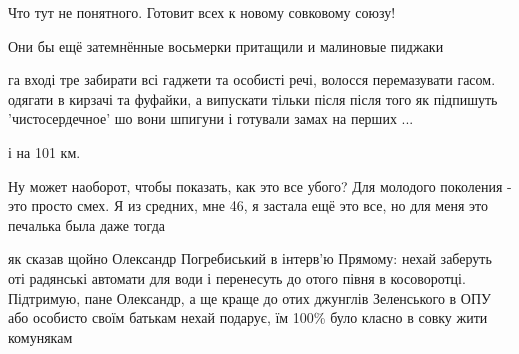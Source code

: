 \begin{itemize}
Что тут не понятного. Готовит всех к новому совковому союзу!

 
Они бы ещё затемнённые восьмерки притащили и малиновые пиджаки

 

га вході тре забирати всі гаджети та особисті речі, волосся перемазувати гасом.
одягати в кирзачі та фуфайки, а випускати тільки після після того як підпишуть
'чистосердечное' шо вони шпигуни і готували замах на перших ...

і на 101 км.


 
Ну может наоборот, чтобы показать, как это все убого? Для молодого поколения -
это просто смех. Я из средних, мне 46, я застала ещё это все, но для меня это
печалька была даже тогда

 

як сказав щойно Олександр Погребиський в інтерв'ю Прямому: нехай заберуть оті
радянські автомати для води і перенесуть до отого півня в косоворотці.
Підтримую, пане Олександр, а ще краще до отих джунглів Зеленського в ОПУ або
особисто своїм батькам нехай подарує, їм 100\% було класно в совку жити комунякам


 

\end{itemize}
